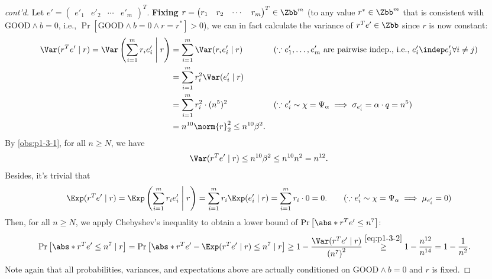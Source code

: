 \begin{answer}[iii]
\begin{proof}[cont'd]
        Let $e'=\begin{pmatrix}
            e'_1 & e'_2 & \cdots& e'_m 
        \end{pmatrix}^T$. 
        \textbf{Fixing $r=\begin{pmatrix}
            r_1 & r_2 & \cdots& r_m 
        \end{pmatrix}^T\in\Zbb^m$} (to any value $r^\ast\in\Zbb^m$ that is consistent with $ \textrm{GOOD}\land b=0$, i.e., $\Pr[\textrm{GOOD} \land b=0 \land r=r^\ast]\gt 0$), we can in fact calculate the variance of $r^Te'\in\Zbb$ since $r$ is now constant:
        \begin{align*}
            \Var(r^Te'\mid r)=\Var\left(\sum_{i=1}^m r_i e'_i \Biggm \vert r\right)
            &=\sum_{i=1}^m  \Var(r_i e'_i \mid r) && (\because e'_1,\ldots, e'_m \textrm{ are pairwise indep., i.e., } e'_i\indep e'_j \forall i\neq j)\\
            &= \sum_{i=1}^m  r_i^2\Var(e'_i \mid r)\\
            &= \sum_{i=1}^m  r_i^2\cdot (n^{5})^2 && (\because e'_i\sim \chi= \Psi_\alpha \implies \sigma_{e'_i}= \alpha \cdot q=n^{5})\\
            &= n^{10} \norm{r}_2^2 \le n^{10}\beta^2.
        \end{align*}
        By \autoref{obs:p1-3-1}, for all $n\ge N$, we have
        \begin{equation}\label{eq:p1-3-2}
            \Var(r^Te' \mid r)\le n^{10}\beta^2\le n^{10}n^2=n^{12}.
        \end{equation}
        Besides, it's trivial that
        \[
            \Exp(r^Te'\mid r) =\Exp\left(\sum_{i=1}^m r_i e'_i \Biggm\vert r\right) = \sum_{i=1}^m r_i \Exp(e'_i \mid r) = \sum_{i=1}^m r_i\cdot 0=0. \qquad (\because e'_i\sim \chi= \Psi_\alpha \implies \mu_{e'_i}=0)
        \]
        Then, for all $n\ge N$, we apply Chebyshev's inequality to obtain a lower bound of $ \Pr\left[ \abs*{r^Te'} \le n^7\right]$:
        \begin{align}\label{eq:p1-3-3}
            \Pr\left[ \abs*{r^Te'} \le n^7 \mid r\right]
            &= \Pr\left[ \abs*{r^Te' - \Exp(r^Te'\mid r)} \le n^7 \mid r\right]
            \ge 1-\frac{\Var(r^Te'\mid r)}{\left(n^7\right)^2}
            \stackrel{\eqref{eq:p1-3-2}}\ge 1-\frac{n^{12}}{n^{14}}
            =1-\frac{1}{n^2}.
        \end{align}
        Note again that all probabilities, variances, and expectations above are actually conditioned on $\textrm{GOOD} \land b=0$ and $r$ is fixed.


\end{proof}
\end{answer}
